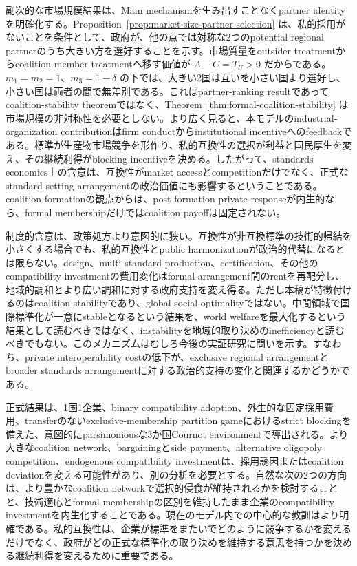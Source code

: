 副次的な市場規模結果は、Main mechanismを生み出すことなくpartner identityを明確化する。Proposition~\ref{prop:market-size-partner-selection} は、私的採用がないことを条件として、政府が、他の点では対称な2つのpotential regional partnerのうち大きい方を選好することを示す。市場質量をoutsider treatmentからcoalition-member treatmentへ移す価値が $A-C=T_U>0$ だからである。$m_1=m_2=1$、$m_3=1-\delta$ の下では、大きい2国は互いを小さい国より選好し、小さい国は両者の間で無差別である。これはpartner-ranking resultであってcoalition-stability theoremではなく、Theorem~\ref{thm:formal-coalition-stability} は市場規模の非対称性を必要としない。より広く見ると、本モデルのindustrial-organization contributionはfirm conductからinstitutional incentiveへのfeedbackである。標準が生産物市場競争を形作り、私的互換性の選択が利益と国民厚生を変え、その継続利得がblocking incentiveを決める。したがって、standards economics上の含意は、互換性がmarket accessとcompetitionだけでなく、正式なstandard-setting arrangementの政治価値にも影響するということである。coalition-formationの観点からは、post-formation private responseが内生的なら、formal membershipだけではcoalition payoffは固定されない。

制度的含意は、政策処方より意図的に狭い。互換性が非互換標準の技術的帰結を小さくする場合でも、私的互換性とpublic harmonizationが政治的代替になるとは限らない。design、multi-standard production、certification、その他のcompatibility investmentの費用変化はformal arrangement間のrentを再配分し、地域的調和とより広い調和に対する政府支持を変え得る。ただし本稿が特徴付けるのはcoalition stabilityであり、global social optimalityではない。中間領域で国際標準化が一意にstableとなるという結果を、world welfareを最大化するという結果として読むべきではなく、instabilityを地域的取り決めのinefficiencyと読むべきでもない。このメカニズムはむしろ今後の実証研究に問いを示す。すなわち、private interoperability costの低下が、exclusive regional arrangementとbroader standards arrangementに対する政治的支持の変化と関連するかどうかである。

正式結果は、1国1企業、binary compatibility adoption、外生的な固定採用費用、transferのないexclusive-membership partition gameにおけるstrict blockingを備えた、意図的にparsimoniousな3か国Cournot environmentで導出される。より大きなcoalition network、bargainingとside payment、alternative oligopoly competition、endogenous compatibility investmentは、採用誘因またはcoalition deviationを変える可能性があり、別の分析を必要とする。自然な次の2つの方向は、より豊かなcoalition networkで選択的侵食が維持されるかを検討することと、技術適応とformal membershipの区別を維持したまま企業のcompatibility investmentを内生化することである。現在のモデル内での中心的な教訓はより明確である。私的互換性は、企業が標準をまたいでどのように競争するかを変えるだけでなく、政府がどの正式な標準化の取り決めを維持する意思を持つかを決める継続利得を変えるために重要である。
